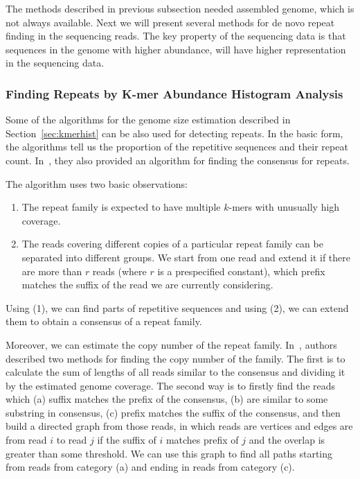 The methods described in previous subsection needed assembled genome, which is not always available. Next we will present several methods for de novo repeat finding in the sequencing reads. The key property of the sequencing data is that sequences in the genome with higher abundance, will have higher representation in the sequencing data.

\subsubsection{Finding Repeats by K-mer Abundance Histogram Analysis}

Some of the algorithms for the genome size estimation described in Section~\ref{sec:kmerhist} can be also used for detecting repeats.
In the basic form, the algorithms tell us the proportion of the repetitive sequences and their repeat count. In~\cite{waterman}, they also provided an algorithm for finding the consensus for repeats.

The algorithm uses two basic observations:
\begin{enumerate}
  \item The repeat family is expected to have multiple $k$-mers with  unusually high coverage.
  \item The reads covering different copies of a particular repeat family can be separated into different groups.
  We start from one read and extend it if there are more than $r$ reads (where $r$ is a prespecified constant), which prefix matches the suffix of the read we are currently considering.
\end{enumerate}

Using (1), we can find parts of repetitive sequences and using (2), we can extend them to obtain a consensus of a repeat family.

Moreover, we can estimate the copy number of the repeat family. In~\cite{waterman}, authors described two methods for finding the copy number of the family.
The first is to calculate the sum of lengths of all reads similar to the consensus and dividing it by the estimated genome coverage.
The second way is to firstly find the reads which (a) suffix matches the prefix of the consensus, (b) are similar to some substring in consensus, (c) prefix matches the suffix of the consensus, and then build a directed graph from those reads, in which reads are vertices and edges are from read $i$ to read $j$ if the suffix of $i$ matches prefix of $j$ and the overlap is greater than some threshold. We can use this graph to find all paths starting from reads from category (a) and ending in reads from category (c).

